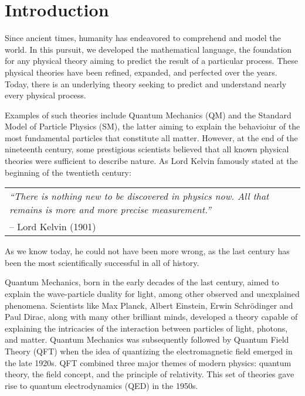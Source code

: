 \chapter*{Introduction}

Since ancient times, humanity has endeavored to comprehend and model the world. In this pursuit, we developed the mathematical language, the foundation for any physical theory aiming to predict the result of a particular process. These physical theories have been refined, expanded, and perfected over the years. Today, there is an underlying theory seeking to predict and understand nearly every physical process.

Examples of such theories include Quantum Mechanics (QM) and the Standard Model of Particle Physics (SM), the latter aiming to explain the behavioiur of the most fundamental particles that constitute all matter. However, at the end of the nineteenth century, some prestigious scientists believed that all known physical theories were sufficient to describe nature. As Lord Kelvin famously stated at the beginning of the twentieth century:
\begin{center}
    \begin{tabular}{p{12cm}}
        \emph{``There is nothing new to be discovered in physics now. All that remains is more and more precise measurement.''}\\
        \hfill{}-- Lord Kelvin (1901)\\
    \end{tabular}
\end{center}
As we know today, he could not have been more wrong, as the last century has been the most scientifically successful in all of history.

Quantum Mechanics, born in the early decades of the last century, aimed to explain the wave-particle duality for light, among other observed and unexplained phenomena. Scientists like Max Planck, Albert Einstein, Erwin Schrödinger and Paul Dirac, along with many other brilliant minds, developed a theory capable of explaining the intricacies of the interaction between particles of light, photons, and matter. Quantum Mechanics was subsequently followed by Quantum Field Theory (QFT) when the idea of quantizing the electromagnetic field emerged in the late 1920s. QFT combined three major themes of modern physics: quantum theory, the field concept, and the principle of relativity. This set of theories gave rise to quantum electrodynamics (QED) in the 1950s.


